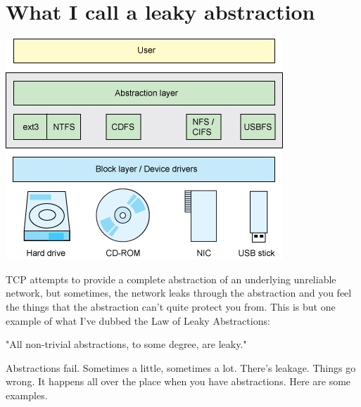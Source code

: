 \documentclass{article}
\begin{document}
\section{What I call a leaky abstraction}

\begin{center}
\includegraphics{What-is-this-Abstraction.jpg}
\end{center}

 TCP attempts to provide a complete abstraction of an underlying unreliable network, but sometimes, the network leaks through the abstraction and you feel the things that the abstraction can't quite protect you from. This is but one example of what I've dubbed the Law of Leaky Abstractions:

"All non-trivial abstractions, to some degree, are leaky."

Abstractions fail. Sometimes a little, sometimes a lot. There's leakage. Things go wrong. It happens all over the place when you have abstractions. Here are some examples.
\end{document}
